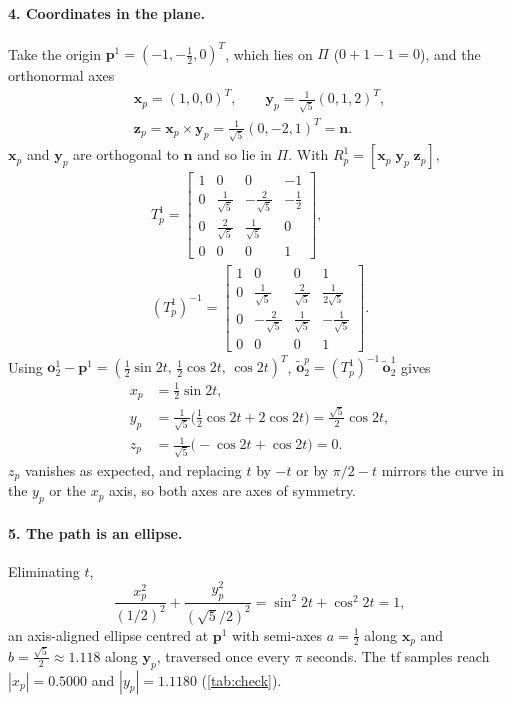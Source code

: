 \documentclass[a4paper]{tufte-handout}
\begin{document}
\paragraph{4. Coordinates in the plane.}
Take the origin $\bm p^1 = (-1, -\tfrac12, 0)^T$, which lies on $\Pi$
($0 + 1 - 1 = 0$), and the orthonormal axes
\begin{gather*}
\bm x_p = (1, 0, 0)^T, \qquad \bm y_p = \tfrac{1}{\sqrt5}(0, 1, 2)^T,\\
\bm z_p = \bm x_p \times \bm y_p = \tfrac{1}{\sqrt5}(0, -2, 1)^T = \bm n .
\end{gather*}
$\bm x_p$ and $\bm y_p$ are orthogonal to $\bm n$ and so lie in $\Pi$.
With $R^1_p = [\bm x_p\; \bm y_p\; \bm z_p]$,
\begin{gather*}
T^1_p = \begin{bmatrix} 1 & 0 & 0 & -1\\ 0 & \frac{1}{\sqrt5} & -\frac{2}{\sqrt5} & -\frac12\\ 0 & \frac{2}{\sqrt5} & \frac{1}{\sqrt5} & 0\\ 0 & 0 & 0 & 1 \end{bmatrix},
\\
(T^1_p)^{-1} = \begin{bmatrix} 1 & 0 & 0 & 1\\ 0 & \frac{1}{\sqrt5} & \frac{2}{\sqrt5} & \frac{1}{2\sqrt5}\\ 0 & -\frac{2}{\sqrt5} & \frac{1}{\sqrt5} & -\frac{1}{\sqrt5}\\ 0 & 0 & 0 & 1 \end{bmatrix}.
\end{gather*}
Using $\bm o_2^1 - \bm p^1 = (\tfrac12\sin 2t,\, \tfrac12\cos 2t,\, \cos 2t)^T$,
$\tilde{\bm o}_2^p = (T^1_p)^{-1}\,\tilde{\bm o}_2^1$ gives
\begin{align*}
x_p &= \tfrac12\sin 2t,\\
y_p &= \tfrac{1}{\sqrt5}\bigl(\tfrac12\cos 2t + 2\cos 2t\bigr) = \tfrac{\sqrt5}{2}\cos 2t,\\
z_p &= \tfrac{1}{\sqrt5}\bigl(-\cos 2t + \cos 2t\bigr) = 0 .
\end{align*}
$z_p$ vanishes as expected, and replacing $t$ by $-t$ or by $\pi/2 - t$
mirrors the curve in the $y_p$ or the $x_p$ axis, so both axes are axes of
symmetry.

\paragraph{5. The path is an ellipse.}
Eliminating $t$,
\begin{equation}\label{eq:ellipse}
\frac{x_p^2}{(1/2)^2} + \frac{y_p^2}{(\sqrt5/2)^2} = \sin^2 2t + \cos^2 2t = 1 ,
\end{equation}
an axis-aligned ellipse centred at $\bm p^1$ with semi-axes
$a = \tfrac12$ along $\bm x_p$ and $b = \tfrac{\sqrt5}{2} \approx 1.118$ along
$\bm y_p$, traversed once every $\pi$ seconds.
The tf samples reach $|x_p| = 0.5000$ and $|y_p| = 1.1180$ (\cref{tab:check}).
\end{document}
